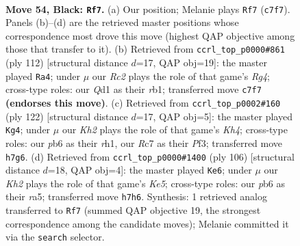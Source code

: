 \documentclass[11pt]{article}
\begin{document}
\clearpage

\begin{figure}[p]\centering
\begin{subfigure}{0.46\textwidth}\centering
\resizebox{\linewidth}{!}{%
\newchessgame
\chessboard[
  setfen={8/2r3pk/1P6/8/3pp3/6K1/5P2/3q4 b - - 0 54},
  showmover=false,
  pgfstyle=straightmove, color=movearrow, markmove={c7-f7}
]}
\caption{}
\end{subfigure}\hfill
\begin{subfigure}{0.46\textwidth}\centering
\resizebox{\linewidth}{!}{%
\newchessgame
\chessboard[
  setfen={8/7k/4p3/5p2/6RP/4P1P1/4K3/1r6 w - - 0 57},
  showmover=false,
  pgfstyle=straightmove, color=movearrow, markmove={g4-a4}
]}
\caption{}
\end{subfigure}
\\[4pt]
\begin{subfigure}{0.46\textwidth}\centering
\resizebox{\linewidth}{!}{%
\newchessgame
\chessboard[
  setfen={1R6/6p1/1P3k1p/7P/7K/5P2/8/7r w - - 7 62},
  showmover=false,
  pgfstyle=straightmove, color=movearrow, markmove={h4-g4}
]}
\caption{}
\end{subfigure}\hfill
\begin{subfigure}{0.46\textwidth}\centering
\resizebox{\linewidth}{!}{%
\newchessgame
\chessboard[
  setfen={6k1/6p1/7p/r3KP1P/8/5R2/8/8 w - - 8 54},
  showmover=false,
  pgfstyle=straightmove, color=movearrow, markmove={e5-e6}
]}
\caption{}
\end{subfigure}
\caption{\textbf{Move 54, Black: \texttt{Rf7}.} (a) Our position; Melanie plays \texttt{Rf7} (\texttt{c7f7}). Panels (b)--(d) are the retrieved master positions whose correspondence most drove this move (highest QAP objective among those that transfer to it). (b) Retrieved from \texttt{ccrl\_top\_p0000\#861} (ply 112) [structural distance $d$=17, QAP obj=19]: the master played \texttt{Ra4}; under $\mu$ our \emph{Rc2} plays the role of that game's \emph{Rg4}; cross-type roles: our \emph{Q}d1 as their \emph{r}b1; transferred move \texttt{c7f7} \textbf{(endorses this move)}. (c) Retrieved from \texttt{ccrl\_top\_p0002\#160} (ply 122) [structural distance $d$=17, QAP obj=5]: the master played \texttt{Kg4}; under $\mu$ our \emph{Kh2} plays the role of that game's \emph{Kh4}; cross-type roles: our \emph{p}b6 as their \emph{r}h1, our \emph{R}c7 as their \emph{P}f3; transferred move \texttt{h7g6}. (d) Retrieved from \texttt{ccrl\_top\_p0000\#1400} (ply 106) [structural distance $d$=18, QAP obj=4]: the master played \texttt{Ke6}; under $\mu$ our \emph{Kh2} plays the role of that game's \emph{Ke5}; cross-type roles: our \emph{p}b6 as their \emph{r}a5; transferred move \texttt{h7h6}. Synthesis: 1 retrieved analog transferred to \texttt{Rf7} (summed QAP objective 19, the strongest correspondence among the candidate moves); Melanie committed it via the \texttt{search} selector.}
\label{fig:thought-m107}
\end{figure}
\end{document}
